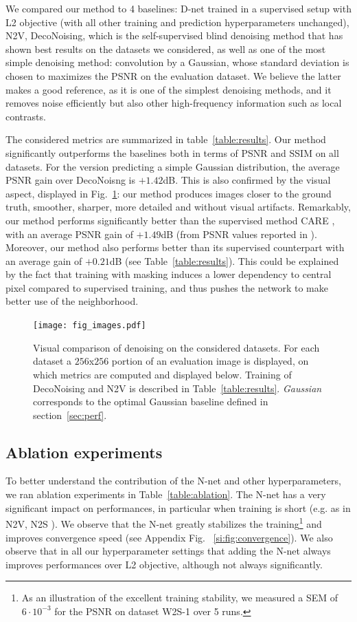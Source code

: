 \documentclass{article}
\begin{document}
We compared our method to 4 baselines: D-net trained in a supervised setup with L2 objective (with all other training and prediction hyperparameters unchanged), N2V, DecoNoising, which is the self-supervised blind denoising method that has shown best results on the datasets we considered, as well as one of the most simple denoising method: convolution by a Gaussian, whose standard deviation is chosen to maximizes the PSNR on the evaluation dataset.
We believe the latter makes a good reference, as it is one of the simplest denoising methods, and it removes noise efficiently but also other high-frequency information such as local contrasts.

The considered metrics are summarized in table~\ref{table:results}.
Our method significantly outperforms the baselines both in terms of PSNR and SSIM on all datasets.
For the version predicting a simple Gaussian distribution, the average PSNR gain over DecoNoisng is $+1.42$dB.
This is also confirmed by the visual aspect, displayed in Fig.~\ref{fig:images}: our method produces images closer to the ground truth, smoother, sharper, more detailed and without visual artifacts.
Remarkably, our method performs significantly better than the supervised method CARE \cite{weigert2017content}, with an average PSNR gain of $+1.49$dB (from PSNR values reported in \cite{goncharova2020}).
Moreover, our method also performs better than its supervised counterpart with an average gain of $+0.21$dB (see Table~\ref{table:results}).
This could be explained by the fact that training with masking induces a lower dependency to central pixel compared to supervised training, and thus pushes the network to make better use of the neighborhood.

\begin{figure}[!hbp]
\vskip -0.1in
\texttt{[image: fig\_images.pdf]}
\caption{Visual comparison of denoising on the considered datasets. For each dataset a $256$x$256$ portion of an evaluation image is displayed, on which metrics are computed and displayed below. Training of DecoNoising and N2V is described in Table~\ref{table:results}. \textit{Gaussian} corresponds to the optimal Gaussian baseline defined in section~\ref{sec:perf}.}
\label{fig:images}
\end{figure}

\subsection{Ablation experiments}

To better understand the contribution of the N-net and other hyperparameters, we ran ablation experiments in Table~\ref{table:ablation}. The N-net has a very significant impact on performances, in particular when training is short (e.g. as in N2V, N2S \cite{krull2018noise2void, goncharova2020}). We observe that the N-net greatly stabilizes the training\footnote{As an illustration of the excellent training stability, we measured a SEM of $6\cdot10^{-3}$ for the PSNR on dataset W2S-1 over 5 runs.} and improves convergence speed (see Appendix Fig. ~\ref{si:fig:convergence}). We also observe that in all our hyperparameter settings that adding the N-net always improves performances over L2 objective, although not always significantly.
\end{document}
